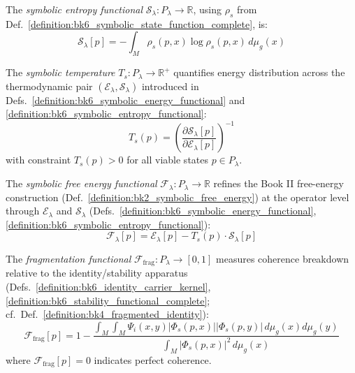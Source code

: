 \begin{definition}
\label{definition:bk6_symbolic_entropy_functional}
The \emph{symbolic entropy functional} $\mathcal{S}_\lambda : P_\lambda \to \mathbb{R}$, using $\rho_s$ from Def.~\ref{definition:bk6_symbolic_state_function_complete}, is:
\begin{equation}
\mathcal{S}_\lambda[p] = -\int_M \rho_s(p,x) \log \rho_s(p,x) \, d\mu_g(x)
\end{equation}
\end{definition}

\begin{definition}
\label{definition:bk6_symbolic_temperature}
The \emph{symbolic temperature} $T_s : P_\lambda \to \mathbb{R}^+$ quantifies energy distribution across the thermodynamic pair \((\mathcal{E}_\lambda,\mathcal{S}_\lambda)\) introduced in Defs.~\ref{definition:bk6_symbolic_energy_functional} and \ref{definition:bk6_symbolic_entropy_functional}:
\begin{equation}
T_s(p) = \left(\frac{\partial \mathcal{S}_\lambda[p]}{\partial \mathcal{E}_\lambda[p]}\right)^{-1}
\end{equation}
with constraint $T_s(p) > 0$ for all viable states $p \in P_\lambda$.
\end{definition}

\begin{definition}
\label{definition:bk6_symbolic_free_energy_functional}
The \emph{symbolic free energy functional} $\mathcal{F}_\lambda : P_\lambda \to \mathbb{R}$ refines the Book II free-energy construction (Def.~\ref{definition:bk2_symbolic_free_energy}) at the operator level through \(\mathcal{E}_\lambda\) and \(\mathcal{S}_\lambda\) (Defs.~\ref{definition:bk6_symbolic_energy_functional}, \ref{definition:bk6_symbolic_entropy_functional}):
\begin{equation}
\mathcal{F}_\lambda[p] = \mathcal{E}_\lambda[p] - T_s(p) \cdot \mathcal{S}_\lambda[p]
\end{equation}
\end{definition}

\begin{definition}
\label{definition:bk6_fragmentation_functional}
The \emph{fragmentation functional} $\mathcal{F}_{\text{frag}} : P_\lambda \to [0,1]$ measures coherence breakdown relative to the identity/stability apparatus (Defs.~\ref{definition:bk6_identity_carrier_kernel}, \ref{definition:bk6_stability_functional_complete}; cf.~Def.~\ref{definition:bk4_fragmented_identity}):
\begin{equation}
\mathcal{F}_{\text{frag}}[p] = 1 - \frac{\int_M \int_M \Psi_i(x,y)|\Phi_s(p,x)||\Phi_s(p,y)| \, d\mu_g(x) d\mu_g(y)}{\int_M |\Phi_s(p,x)|^2 \, d\mu_g(x)}
\end{equation}
where $\mathcal{F}_{\text{frag}}[p] = 0$ indicates perfect coherence.
\end{definition}


